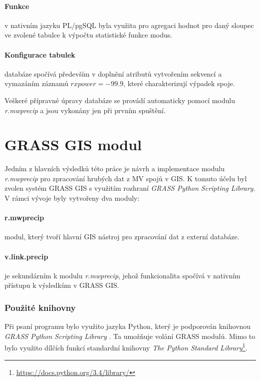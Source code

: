 \documentclass[a4paper,12pt,oneside]{report}
\begin{document}
\paragraph*{Funkce} v nativním jazyku PL/pgSQL byla využita pro
agregaci hodnot pro daný sloupec ve zvolené tabulce k výpočtu
statistické funkce modus.

\paragraph*{Konfigurace tabulek} databáze spočívá především v doplnění
atributů vytvořením sekvencí a vymazáním záznamů $rxpower= -99.9$,
které charakterizují výpadek spoje.

\bigskip

Veškeré přípravné úpravy databáze se provádí automaticky pomocí modulu
\textit{r.mwprecip} a jsou vykonány jen při prvním spuštění.








\section{GRASS GIS modul}
\label{sec:grassgismodule}
Jedním z hlavních výsledků této práce je návrh a implementace
modulu \textit{r.mwprecip} pro zpracování hrubých dat z MV spojů v
GIS. K tomuto účelu byl zvolen systém GRASS GIS s využitím rozhraní
\textit{GRASS Python Scripting Library}. V rámci vývoje byly vytvořeny
dva moduly:

\paragraph*{r.mwprecip} modul, který tvoří hlavní GIS nástroj pro
zpracování dat z externí databáze.

\paragraph*{v.link.precip} je sekundárním k modulu
\textit{r.mwprecip}, jehož funkcionalita spočívá v nativním přístupu k
výsledkům v GRASS GIS.

\subsubsection{Použité knihovny}
Při psaní programu bylo využito jazyka Python, který je podporován
knihovnou \textit{GRASS Python Scripting Library} \cite{spygrass}. Ta
umožňuje volání GRASS modulů. Mimo to bylo využito dílčích funkcí standardní
knihovny \textit{The Python Standard
  Library}\footnote{\url{https://docs.python.org/3.4/library/}}.
\end{document}

